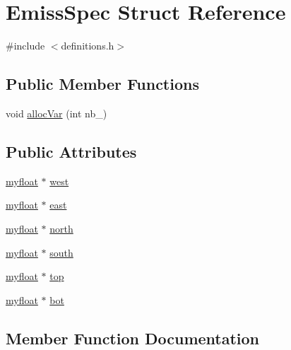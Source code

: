 \hypertarget{structEmissSpec}{}\section{Emiss\+Spec Struct Reference}
\label{structEmissSpec}


{\ttfamily \#include $<$definitions.\+h$>$}

\subsection*{Public Member Functions}
\begin{DoxyCompactItemize}
\item 
void \hyperlink{structEmissSpec_a218449c2632156c6e99e14aba7906f40}{alloc\+Var} (int nb\+\_\+)
\end{DoxyCompactItemize}
\subsection*{Public Attributes}
\begin{DoxyCompactItemize}
\item 
\hyperlink{param_8h_a5f097c9f3873af7be7fc156e6a06ca5e}{myfloat} $\ast$ \hyperlink{structEmissSpec_a0d3b180d082837fce1082166f5043a9f}{west}
\item 
\hyperlink{param_8h_a5f097c9f3873af7be7fc156e6a06ca5e}{myfloat} $\ast$ \hyperlink{structEmissSpec_a10262cb920a979a55e6a556452f4e1c2}{east}
\item 
\hyperlink{param_8h_a5f097c9f3873af7be7fc156e6a06ca5e}{myfloat} $\ast$ \hyperlink{structEmissSpec_a4fa3d368c2b64274a109009098f85bbe}{north}
\item 
\hyperlink{param_8h_a5f097c9f3873af7be7fc156e6a06ca5e}{myfloat} $\ast$ \hyperlink{structEmissSpec_a49e416cf35f060c46c97e95b389e3aff}{south}
\item 
\hyperlink{param_8h_a5f097c9f3873af7be7fc156e6a06ca5e}{myfloat} $\ast$ \hyperlink{structEmissSpec_ad6bc45022c933e9db72def44965ebd1d}{top}
\item 
\hyperlink{param_8h_a5f097c9f3873af7be7fc156e6a06ca5e}{myfloat} $\ast$ \hyperlink{structEmissSpec_a51fa5634d8a326cb667a62bba9931e4f}{bot}
\end{DoxyCompactItemize}


\subsection{Member Function Documentation}
\mbox{\label{structEmissSpec_a218449c2632156c6e99e14aba7906f40}} 

